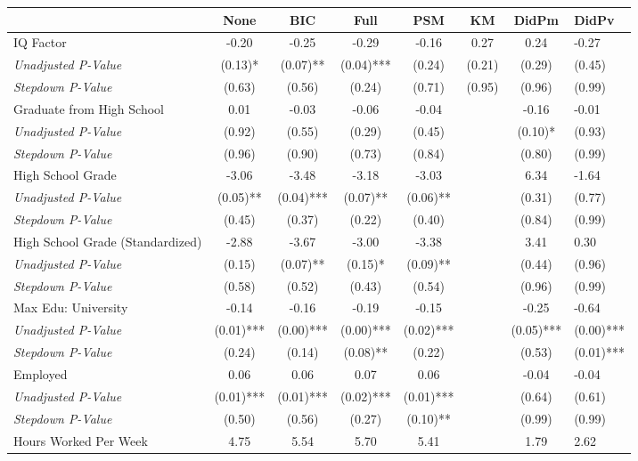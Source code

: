 \begin{tabular}{l c c c c c c}
\toprule
 & None & BIC & Full & PSM & KM & DidPm & DidPv \\
\midrule
IQ Factor & -0.20 & -0.25 & -0.29 & -0.16 & 0.27 & 0.24 & -0.27 \\
\quad \textit{Unadjusted P-Value} & (0.13)* & (0.07)** & (0.04)*** & (0.24) & (0.21) & (0.29) & (0.45) \\
\quad \textit{Stepdown P-Value} & (0.63) & (0.56) & (0.24) & (0.71) & (0.95) & (0.96) & (0.99) \\
Graduate from High School & 0.01 & -0.03 & -0.06 & -0.04 & & -0.16 & -0.01 \\
\quad \textit{Unadjusted P-Value} & (0.92) & (0.55) & (0.29) & (0.45) & & (0.10)* & (0.93) \\
\quad \textit{Stepdown P-Value} & (0.96) & (0.90) & (0.73) & (0.84) & & (0.80) & (0.99) \\
High School Grade & -3.06 & -3.48 & -3.18 & -3.03 & & 6.34 & -1.64 \\
\quad \textit{Unadjusted P-Value} & (0.05)** & (0.04)*** & (0.07)** & (0.06)** & & (0.31) & (0.77) \\
\quad \textit{Stepdown P-Value} & (0.45) & (0.37) & (0.22) & (0.40) & & (0.84) & (0.99) \\
High School Grade (Standardized) & -2.88 & -3.67 & -3.00 & -3.38 & & 3.41 & 0.30 \\
\quad \textit{Unadjusted P-Value} & (0.15) & (0.07)** & (0.15)* & (0.09)** & & (0.44) & (0.96) \\
\quad \textit{Stepdown P-Value} & (0.58) & (0.52) & (0.43) & (0.54) & & (0.96) & (0.99) \\
Max Edu: University & -0.14 & -0.16 & -0.19 & -0.15 & & -0.25 & -0.64 \\
\quad \textit{Unadjusted P-Value} & (0.01)*** & (0.00)*** & (0.00)*** & (0.02)*** & & (0.05)*** & (0.00)*** \\
\quad \textit{Stepdown P-Value} & (0.24) & (0.14) & (0.08)** & (0.22) & & (0.53) & (0.01)*** \\
Employed & 0.06 & 0.06 & 0.07 & 0.06 & & -0.04 & -0.04 \\
\quad \textit{Unadjusted P-Value} & (0.01)*** & (0.01)*** & (0.02)*** & (0.01)*** & & (0.64) & (0.61) \\
\quad \textit{Stepdown P-Value} & (0.50) & (0.56) & (0.27) & (0.10)** & & (0.99) & (0.99) \\
Hours Worked Per Week & 4.75 & 5.54 & 5.70 & 5.41 & & 1.79 & 2.62 \\

\end{tabular}
